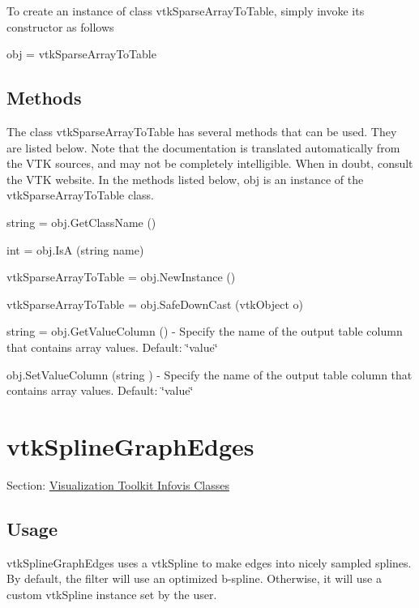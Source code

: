 To create an instance of class vtk\-Sparse\-Array\-To\-Table, simply invoke its constructor as follows \begin{DoxyVerb}  obj = vtkSparseArrayToTable
\end{DoxyVerb}
 \hypertarget{vtkwidgets_vtkxyplotwidget_Methods}{}\subsection{Methods}\label{vtkwidgets_vtkxyplotwidget_Methods}
The class vtk\-Sparse\-Array\-To\-Table has several methods that can be used. They are listed below. Note that the documentation is translated automatically from the V\-T\-K sources, and may not be completely intelligible. When in doubt, consult the V\-T\-K website. In the methods listed below, {\ttfamily obj} is an instance of the vtk\-Sparse\-Array\-To\-Table class. 
\begin{DoxyItemize}
\item {\ttfamily string = obj.\-Get\-Class\-Name ()}  
\item {\ttfamily int = obj.\-Is\-A (string name)}  
\item {\ttfamily vtk\-Sparse\-Array\-To\-Table = obj.\-New\-Instance ()}  
\item {\ttfamily vtk\-Sparse\-Array\-To\-Table = obj.\-Safe\-Down\-Cast (vtk\-Object o)}  
\item {\ttfamily string = obj.\-Get\-Value\-Column ()} -\/ Specify the name of the output table column that contains array values. Default\-: \char`\"{}value\char`\"{}  
\item {\ttfamily obj.\-Set\-Value\-Column (string )} -\/ Specify the name of the output table column that contains array values. Default\-: \char`\"{}value\char`\"{}  
\end{DoxyItemize}\hypertarget{vtkinfovis_vtksplinegraphedges}{}\section{vtk\-Spline\-Graph\-Edges}\label{vtkinfovis_vtksplinegraphedges}
Section\-: \hyperlink{sec_vtkinfovis}{Visualization Toolkit Infovis Classes} \hypertarget{vtkwidgets_vtkxyplotwidget_Usage}{}\subsection{Usage}\label{vtkwidgets_vtkxyplotwidget_Usage}
vtk\-Spline\-Graph\-Edges uses a vtk\-Spline to make edges into nicely sampled splines. By default, the filter will use an optimized b-\/spline. Otherwise, it will use a custom vtk\-Spline instance set by the user.

